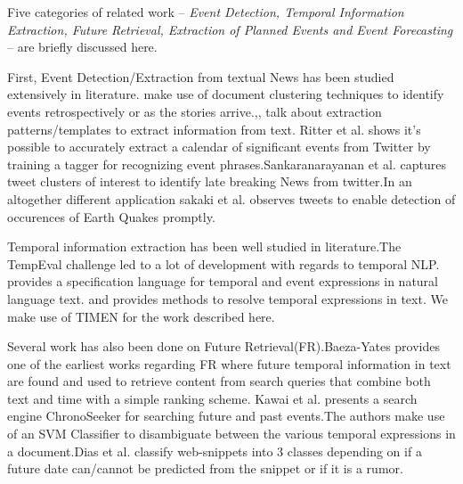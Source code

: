 Five categories of related work -- \emph{Event Detection, Temporal Information Extraction, Future Retrieval, Extraction of Planned Events and Event Forecasting} -- are briefly discussed here.

First, Event Detection/Extraction from textual News has been studied extensively in literature. \cite{Allan:2002:TDT} \cite{Yang:1998:SRO}\cite{Gabrilovich:2004:NPP} make use of document clustering techniques to identify events retrospectively or as the stories arrive.\cite{Chambers:2011:TIE},\cite{Banko07openinformation}, \cite{riloff2003learning} talk about extraction patterns/templates to extract information from text. Ritter et al.\cite{Ritter:2012} shows it's possible to accurately extract a calendar of significant events from Twitter by training a tagger for recognizing event phrases.Sankaranarayanan et al.\cite{Sankaranarayanan:2009:TNT} captures tweet clusters of interest to identify late breaking News from twitter.In an altogether different application sakaki et al.\cite{Sakaki:2010:EST} observes tweets to enable detection of occurences of Earth Quakes promptly.

Temporal information extraction has been well studied in literature.The TempEval challenge\cite{tempeval} led to a lot of development with regards to temporal NLP.\cite{timeml} provides a specification language for temporal and event expressions in natural language text.
\cite{LlorensDGS12} and \cite{tempex} provides methods to resolve temporal expressions in text. We make use of TIMEN \cite{LlorensDGS12} for the work described here.

Several work has also been done on Future Retrieval(FR).Baeza-Yates\cite{baeza2005searching} provides one of the earliest works regarding FR where future temporal information in text are found and used to retrieve content from search queries that combine both text and time with a simple ranking scheme. Kawai et al.\cite{Kawai:2010:CSE} presents a search engine ChronoSeeker for searching future and past events.The authors make use of an SVM Classifier to disambiguate between the various temporal expressions in a document.Dias et al.\cite{dias2011future} classify web-snippets into 3 classes depending on if a future date can/cannot be predicted from the snippet or if it is a rumor.


